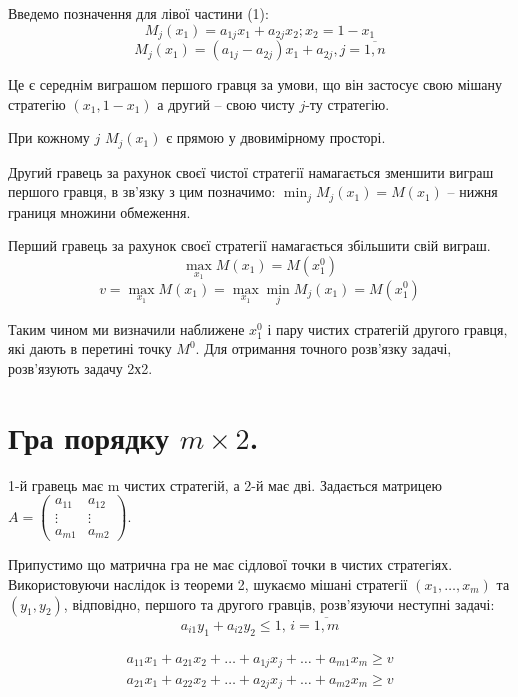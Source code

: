 \documentclass[12pt,a4paper]{report}
\begin{document}
Введемо позначення для лівої частини (1):
\[M_j(x_1) = a_{1j}x_1+a_{2j}x_2; x_2=1-x_1\]
\begin{equation}
M_j(x_1)=(a_{1j}-a_{2j})x_1+a_{2j}, j=\overline{1,n}
\end{equation}

Це є середнім виграшом першого гравця за умови, що він застосує свою мішану стратегію $(x_1,1-x_1)$ а другий -- свою чисту $j$-ту стратегію.

При кожному $j$ $M_j(x_1)$ є прямою у двовимірному просторі.

Другий гравець за рахунок своєї чистої стратегії намагається зменшити виграш першого гравця, в зв'язку з цим позначимо:
$\displaystyle \min_jM_j(x_1)=M(x_1)$ -- нижня границя множини обмеження.

Перший гравець за рахунок своєї стратегії намагається збільшити свій виграш.
\[\max_{x_1} M(x_1) = M(x_1^0)\]
\[v=\max_{x_1} M(x_1)=\max_{x_1} \min_jM_j(x_1)=M(x_1^0)\]

Таким чином ми визначили наближене $x_1^0$ і пару чистих стратегій другого гравця, які дають в перетині точку $M^0$. Для отримання точного розв'язку задачі, розв'язують задачу 2х2. 

\clearpage

\chapter{Гра порядку $m \times 2$.}
1-й гравець має m чистих стратегій, а 2-й має дві.
Задається матрицею $A=\left ( \begin{array}{cccccc}
a_{11}&a_{12}\\
\vdots&\vdots\\
a_{m1}&a_{m2}
\end{array}\right)$.

Припустимо що матрична гра не має сідлової точки в чистих стратегіях. Використовуючи наслідок із теореми 2, шукаємо мішані стратегії $(x_1,\dots, x_m)$ та $(y_1,y_2)$, відповідно, першого та другого гравців, розв'язуючи неступні задачі:
\begin{equation}
a_{i1}y_1+a_{i2}y_2 \le 1, \, i=\overline{1,m}
\end{equation}

\begin{equation}
\begin{array}{l}
a_{11}x_1+a_{21}x_2+\dots+a_{1j}x_j+\dots+a_{m1}x_m \ge v\\
a_{21}x_1+a_{22}x_2+\dots+a_{2j}x_j+\dots+a_{m2}x_m \ge v
\end{array}
\end{equation}
\end{document}
